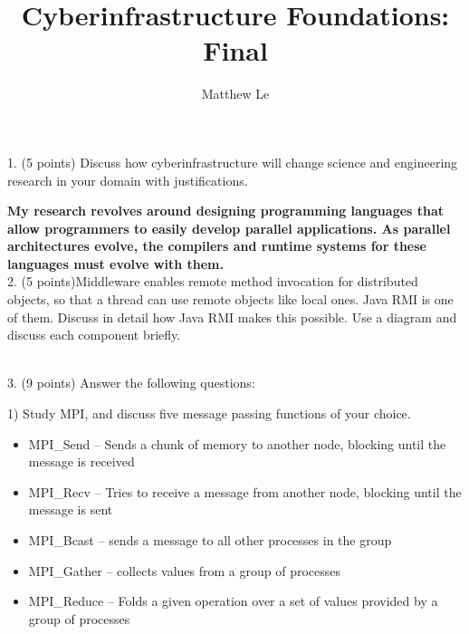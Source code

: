 \documentclass[11pt]{article}
\title{Cyberinfrastructure Foundations: Final}
\author{Matthew Le}
\begin{document}
\maketitle

1. (5 points) Discuss how cyberinfrastructure will change science and engineering research in your domain with justifications.

{\bf My research revolves around designing programming languages that allow programmers to easily develop parallel applications.  As parallel architectures evolve, the compilers and runtime systems for these languages must evolve with them.  }\\


2. (5 points)Middleware enables remote method invocation for distributed objects, so that a thread can use remote objects like local ones. Java RMI is one of them. Discuss in detail how Java RMI makes this possible. Use a diagram and discuss each component briefly.

 \\

3. (9 points) Answer the following questions:

1) Study MPI, and discuss five message passing functions of your choice.
{\bf
\begin{itemize}
\item MPI\_Send -- Sends a chunk of memory to another node, blocking until the message is received
\item MPI\_Recv -- Tries to receive a message from another node, blocking until the message is sent
\item MPI\_Bcast -- sends a message to all other processes in the group
\item MPI\_Gather -- collects values from a group of processes
\item MPI\_Reduce -- Folds a given operation over a set of values provided by a group of processes
\end{itemize}
}
\end{document}
